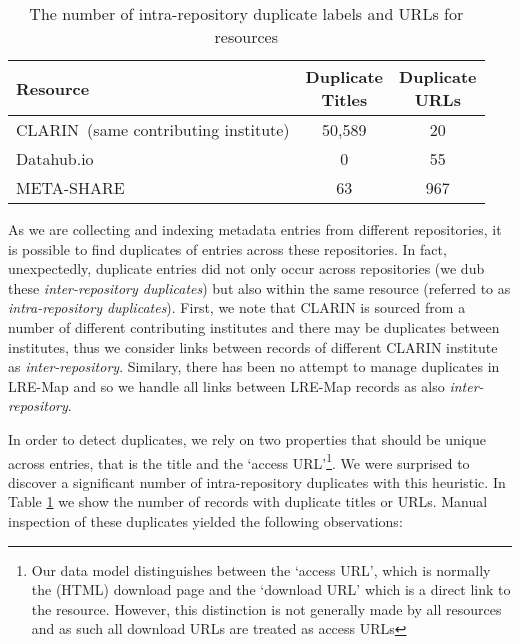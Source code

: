 \documentclass[11pt]{article}
\begin{document}
\begin{table}
    \begin{center}
    \begin{tabular}{l|cc}
        Resource   & \thead{Duplicate \\ Titles} & \thead{Duplicate \\ URLs} \\
        \hline                                                            
        CLARIN{\tiny~(same contributing institute)}     & 50,589           & 20          \\   
        Datahub.io & 0                & 55             \\
        META-SHARE & 63               & 967            \\
    \end{tabular}
    \end{center}
    \caption{\label{tab:self-dupes}The number of intra-repository duplicate labels and URLs for
    resources}
\end{table}

As we are collecting and indexing metadata entries from different repositories, it is possible to find duplicates of entries across these repositories. 
In fact, unexpectedly, duplicate entries did not only occur across repositories
(we dub these \emph{inter-repository duplicates}) but also within the same
resource (referred to as \emph{intra-repository duplicates}). First, we note that CLARIN
is sourced from a number of different contributing institutes and there may be
duplicates between institutes, thus we consider links between records
of different CLARIN institute as \emph{inter-repository}. Similary, there has
been no attempt to manage duplicates in LRE-Map and so we handle all links
between LRE-Map records as also \emph{inter-repository}.

In order to detect duplicates, we rely on two properties
that should be unique across entries, that is the title and the `access URL'\footnote{Our data model distinguishes
    between the `access URL', which is normally the (HTML) download page and the
    `download URL' which is a direct link to the resource. However, this
    distinction is not generally made by all resources and as such all
download URLs are treated as access URLs}. We were surprised 
to discover a significant number of intra-repository duplicates with this heuristic.
In Table
\ref{tab:self-dupes} we show the number of records with duplicate titles or URLs.
Manual inspection of these duplicates yielded the following
observations:
\end{document}
